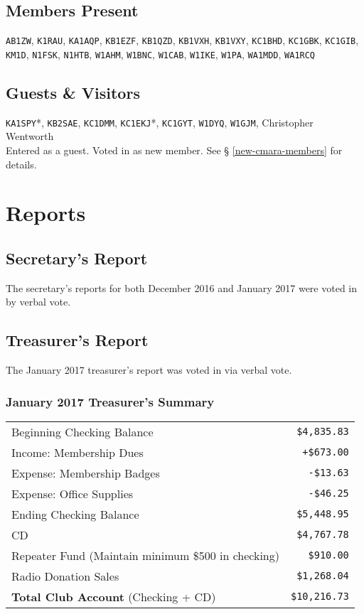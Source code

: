 \documentclass[10pt,letterpaper]{article}
\begin{document}
\subsection{Members Present}
\texttt{AB1ZW},
\texttt{K1RAU},
\texttt{KA1AQP},
\texttt{KB1EZF},
\texttt{KB1QZD},
\texttt{KB1VXH},
\texttt{KB1VXY},
\texttt{KC1BHD},
\texttt{KC1GBK},
\texttt{KC1GIB},
\texttt{KM1D},
\texttt{N1FSK},
\texttt{N1HTB},
\texttt{W1AHM},
\texttt{W1BNC},
\texttt{W1CAB},
\texttt{W1IKE},
\texttt{W1PA},
\texttt{WA1MDD},
\texttt{WA1RCQ}

\subsection{Guests \& Visitors}
\texttt{KA1SPY}*,
\texttt{KB2SAE},
\texttt{KC1DMM},
\texttt{KC1EKJ}*,
\texttt{KC1GYT},
\texttt{W1DYQ},
\texttt{W1GJM},
Christopher Wentworth\\

\noindent
\textasteriskcentered{} Entered as a guest. Voted in as new member. See \S{} \ref{new-cmara-members} for details.

\section{Reports}

\subsection{Secretary's Report}
The secretary's reports for both December 2016 and January 2017 were voted in by verbal vote.

\newpage
\subsection{Treasurer's Report}
The January 2017 treasurer's report was voted in via verbal vote.

\subsubsection{January 2017 Treasurer's Summary}
\noindent
\begin{tabular}{|l|r|}
  \hline
  Beginning Checking Balance & \texttt{\$4,835.83} \\
  Income: Membership Dues & \texttt{+\$673.00} \\
  Expense: Membership Badges & \texttt{-\$13.63} \\
  Expense: Office Supplies & \texttt{-\$46.25} \\
  Ending Checking Balance & \texttt{\$5,448.95} \\
  \hline
  \hline
  CD & \texttt{\$4,767.78} \\
  \hline
  \hline
  Repeater Fund (Maintain minimum \$500 in checking) & \texttt{\$910.00} \\
  \hline
  \hline
  Radio Donation Sales & \texttt{\$1,268.04} \\
  \hline
  \hline
  \textbf{Total Club Account} (Checking + CD) & \texttt{\$10,216.73} \\
  \hline
\end{tabular}
\end{document}
